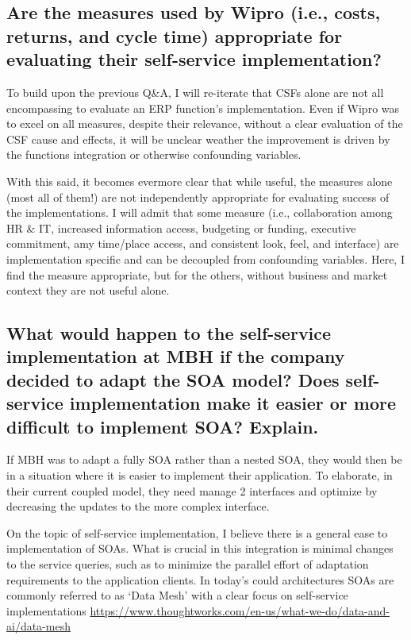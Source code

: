 \documentclass{article}
\begin{document}
\subsection{Are the measures used by Wipro (i.e., costs, returns, and cycle time) appropriate for evaluating their self-service implementation?}
To build upon the previous Q\&A, I will re-iterate that CSFs alone are not all encompassing to evaluate an ERP function's implementation.
Even if Wipro was to excel on all measures, despite their relevance, without a clear evaluation of the CSF cause and effects, it will be unclear weather the improvement is driven by the functions integration or otherwise confounding variables. 

With this said, it becomes evermore clear that while useful, the measures alone (most all of them!) are not independently appropriate for evaluating success of the implementations. 
I will admit that some measure (i.e., collaboration among HR \& IT, increased information access, budgeting or funding, executive commitment, amy time/place access, and consistent look, feel, and interface) are implementation specific and can be decoupled from confounding variables. 
Here, I find the measure appropriate, but for the others, without business and market context they are not useful alone. 

\subsection{What would happen to the self-service implementation at MBH if the company decided to adapt the SOA model? Does self-service implementation make it easier or more difficult to implement SOA? Explain.}
If MBH was to adapt a fully SOA rather than a nested SOA, they would then be in a situation where it is easier to implement their application. 
To elaborate, in their current coupled model, they need manage 2 interfaces and optimize by decreasing the updates to the more complex interface. 

On the topic of self-service implementation, I believe there is a general ease to implementation of SOAs. 
What is crucial in this integration is minimal changes to the service queries, such as to minimize the parallel effort of adaptation requirements to the application clients. 
In today's could architectures SOAs are commonly referred to as `Data Mesh' with a clear focus on self-service implementations \url{https://www.thoughtworks.com/en-us/what-we-do/data-and-ai/data-mesh}


\end{document}
